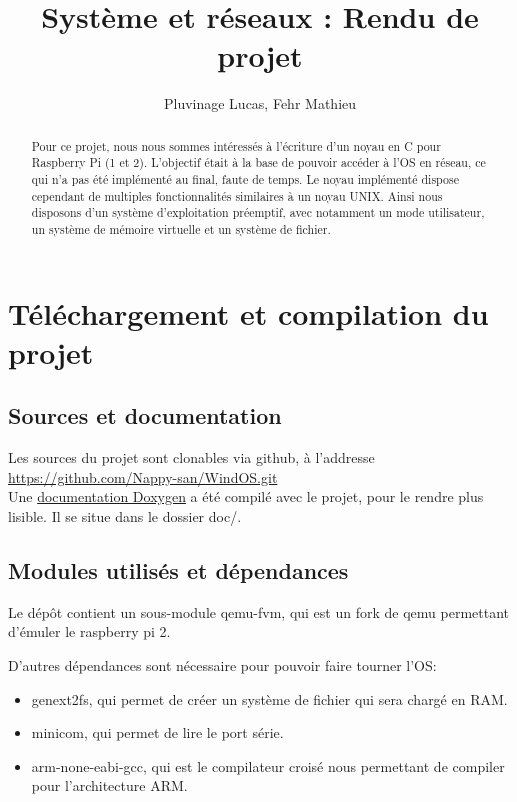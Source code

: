 \documentclass[a4paper]{article}
\author{Pluvinage Lucas, Fehr Mathieu}
\title{Système et réseaux : Rendu de projet}
\begin{document}
\maketitle

\begin{abstract}
  Pour ce projet, nous nous sommes intéressés à l'écriture d'un noyau en C pour
  Raspberry Pi (1 et 2). L'objectif était à la base de pouvoir accéder à l'OS en
  réseau, ce qui n'a pas été implémenté au final, faute de temps. Le noyau
  implémenté dispose cependant de multiples fonctionnalités similaires à un noyau
  UNIX. Ainsi nous disposons d'un système d'exploitation préemptif, avec notamment
  un mode utilisateur, un système de mémoire virtuelle et un système de fichier.
\end{abstract}

\tableofcontents
\newpage

\section{Téléchargement et compilation du projet}
\subsection{Sources et documentation}

Les sources du projet sont clonables via github, à l'addresse
\href{https://github.com/Nappy-san/WindOS.git}{https://github.com/Nappy-san/WindOS.git}\\

Une \href{../doc/index.html}{documentation Doxygen} a été compilé avec le projet, pour le rendre plus
lisible. Il se situe dans le dossier doc/.

\subsection{Modules utilisés et dépendances}

Le dépôt contient un sous-module qemu-fvm, qui est un fork de qemu permettant d'émuler le raspberry pi 2.

D'autres dépendances sont nécessaire pour pouvoir faire tourner l'OS:
\begin{itemize}
\item genext2fs, qui permet de créer un système de fichier qui sera chargé en RAM.
\item minicom, qui permet de lire le port série.
\item arm-none-eabi-gcc, qui est le compilateur croisé nous permettant de compiler pour
l'architecture ARM.
\end{itemize}
\end{document}
